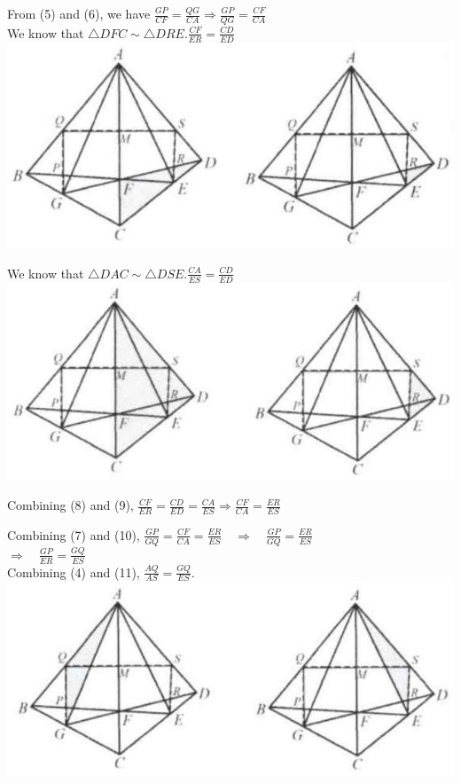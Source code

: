 \documentclass{article}
\begin{document}
From (5) and (6), we have \(\frac{G P}{C F}=\frac{Q G}{C A} \Rightarrow \frac{G P}{Q G}=\frac{C F}{C A}\)\\
We know that \(\triangle D F C \sim \triangle D R E . \frac{C F}{E R}=\frac{C D}{E D}\)\\
\centering
\includegraphics[width=\textwidth]{images/144(1).jpg}

We know that \(\triangle D A C \sim \triangle D S E . \frac{C A}{E S}=\frac{C D}{E D}\)\\
\centering
\includegraphics[width=\textwidth]{images/144.jpg}

Combining (8) and (9), \(\frac{C F}{E R}=\frac{C D}{E D}=\frac{C A}{E S} \Rightarrow \frac{C F}{C A}=\frac{E R}{E S}\)

Combining (7) and (10), \(\frac{G P}{G Q}=\frac{C F}{C A}=\frac{E R}{E S} \quad \Rightarrow \quad \frac{G P}{G Q}=\frac{E R}{E S}\)\\
\(\Rightarrow \quad \frac{G P}{E R}=\frac{G Q}{E S}\)\\
Combining (4) and (11), \(\frac{A Q}{A S}=\frac{G Q}{E S}\).\\
\centering
\includegraphics[width=\textwidth]{images/145.jpg}
\end{document}
